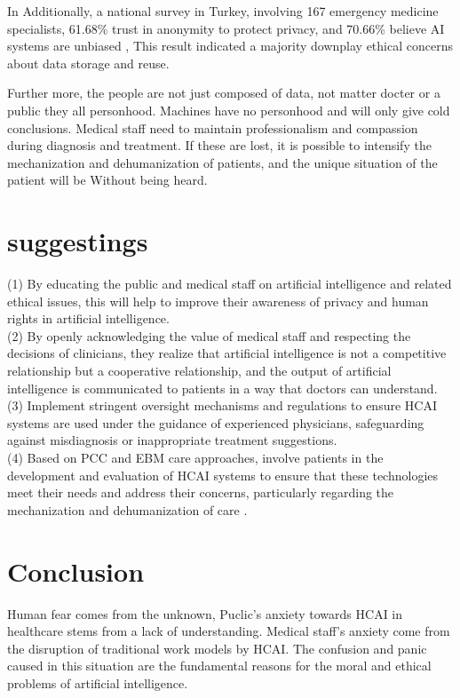 \documentclass[paper=a4, fontsize=11pt]{scrartcl} %
\numberwithin{equation}{section} %
\numberwithin{figure}{section} %
\numberwithin{table}{section} %
\begin{document}
In Additionally, a national survey in Turkey, involving 167 emergency medicine specialists, 61.68\% trust 
in anonymity to protect privacy, and 70.66\% believe AI systems are unbiased \cite{ahunPerceptionsConcernsEmergency2023}, 
This result indicated a majority downplay ethical concerns about data storage and reuse.

Further more, the people are not just composed of data, not matter docter or a public they all personhood. 
Machines have no personhood and will only give cold conclusions. Medical staff need to maintain professionalism 
and compassion during diagnosis and treatment. If these are lost, it is possible to intensify the mechanization 
and dehumanization of patients, and the unique situation of the patient will be Without being heard.



\section{suggestings}
(1) By educating the public and medical staff on artificial intelligence and related ethical issues, 
this will help to improve their awareness of privacy and human rights in artificial intelligence.
\\(2) By openly acknowledging the value of medical staff and respecting the decisions of clinicians, 
they realize that artificial intelligence is not a competitive relationship but a cooperative relationship, 
and the output of artificial intelligence is communicated to patients in a way that doctors can understand.
\\(3) Implement stringent oversight mechanisms and regulations to ensure HCAI systems are used under 
the guidance of experienced physicians, safeguarding against misdiagnosis or inappropriate treatment suggestions.
\\(4) Based on PCC and EBM care approaches, involve patients in the development and evaluation of HCAI systems to ensure that these technologies 
meet their needs and address their concerns, particularly regarding the mechanization and dehumanization of care \cite{iniestaHumanRoleGuarantee2023}.

\section{Conclusion}


Human fear comes from the unknown, Puclic's anxiety towards HCAI in healthcare stems from a lack of understanding.
Medical staff's anxiety come from the disruption of traditional work models by HCAI. The confusion and panic caused 
in this situation are the fundamental reasons for the moral and ethical problems of artificial intelligence.
\end{document}
